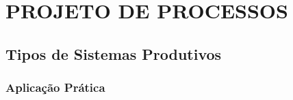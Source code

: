 \chapter{PROJETO DE PROCESSOS}
\label{chap:tiposistemas}

\section{Tipos de Sistemas Produtivos}
\label{sec:metaplic}

\subsection{Aplicação Prática}
\label{subsec:app3}



